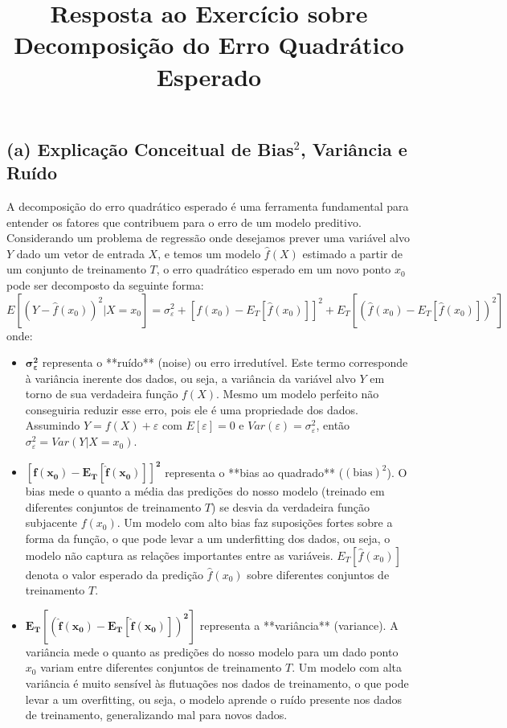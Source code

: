 \documentclass{article}
\title{Resposta ao Exercício sobre Decomposição do Erro Quadrático Esperado}
\author{}
\date{}
\begin{document}
\maketitle

\section*{}

\subsection*{(a) Explicação Conceitual de Bias$^2$, Variância e Ruído}

A decomposição do erro quadrático esperado é uma ferramenta fundamental para entender os fatores que contribuem para o erro de um modelo preditivo. Considerando um problema de regressão onde desejamos prever uma variável alvo $Y$ dado um vetor de entrada $X$, e temos um modelo $\hat{f}(X)$ estimado a partir de um conjunto de treinamento $T$, o erro quadrático esperado em um novo ponto $x_0$ pode ser decomposto da seguinte forma:
\[
E[(Y - \hat{f}(x_0))^2 | X = x_0] = \sigma^2_{\varepsilon} + [f(x_0) - E_T[\hat{f}(x_0)]]^2 + E_T[(\hat{f}(x_0) - E_T[\hat{f}(x_0)])^2]
\]
onde:
\begin{itemize}
    \item $\mathbf{\sigma^2_{\varepsilon}}$ representa o **ruído** (noise) ou erro irredutível. Este termo corresponde à variância inerente dos dados, ou seja, a variância da variável alvo $Y$ em torno de sua verdadeira função $f(X)$. Mesmo um modelo perfeito não conseguiria reduzir esse erro, pois ele é uma propriedade dos dados. Assumindo $Y = f(X) + \varepsilon$ com $E[\varepsilon] = 0$ e $Var(\varepsilon) = \sigma^2_{\varepsilon}$, então $\sigma^2_{\varepsilon} = Var(Y|X=x_0)$.
    \item $\mathbf{[f(x_0) - E_T[\hat{f}(x_0)]]^2}$ representa o **bias ao quadrado** ($(\text{bias})^2$). O bias mede o quanto a média das predições do nosso modelo (treinado em diferentes conjuntos de treinamento $T$) se desvia da verdadeira função subjacente $f(x_0)$. Um modelo com alto bias faz suposições fortes sobre a forma da função, o que pode levar a um underfitting dos dados, ou seja, o modelo não captura as relações importantes entre as variáveis. $E_T[\hat{f}(x_0)]$ denota o valor esperado da predição $\hat{f}(x_0)$ sobre diferentes conjuntos de treinamento $T$.
    \item $\mathbf{E_T[(\hat{f}(x_0) - E_T[\hat{f}(x_0)])^2]}$ representa a **variância** (variance). A variância mede o quanto as predições do nosso modelo para um dado ponto $x_0$ variam entre diferentes conjuntos de treinamento $T$. Um modelo com alta variância é muito sensível às flutuações nos dados de treinamento, o que pode levar a um overfitting, ou seja, o modelo aprende o ruído presente nos dados de treinamento, generalizando mal para novos dados.
\end{itemize}
\end{document}
